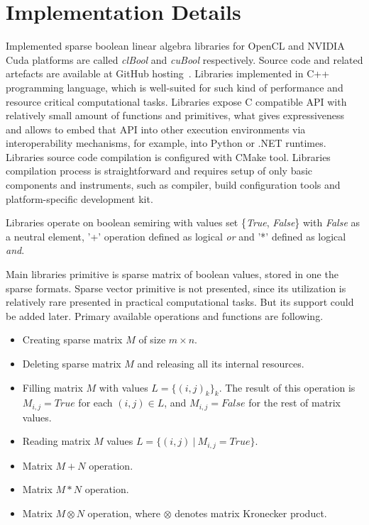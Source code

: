 \section{Implementation Details}



Implemented sparse boolean linear algebra libraries for OpenCL and NVIDIA Cuda platforms are called
\textit{clBool} and \textit{cuBool} respectively. Source code and related artefacts are available at GitHub 
hosting~\cite{todo1, todo2}. Libraries implemented in C++ programming language, which is well-suited for such 
kind of performance and resource critical computational tasks. Libraries expose C compatible API with 
relatively small amount of functions and primitives, what gives expressiveness and allows to embed that API 
into other execution environments via interoperability mechanisms, for example, into Python or .NET runtimes. 
Libraries source code compilation is configured with CMake tool. Libraries compilation process is 
straightforward and requires setup of only basic components and instruments, such as compiler, build 
configuration tools and platform-specific development kit.

Libraries operate on boolean semiring with values set \{\textit{True}, \textit{False}\} with \textit{False} as 
a neutral element, '+' operation defined as logical \textit{or} and '*' defined as logical \textit{and}. 

Main libraries primitive is sparse matrix of boolean values, stored in one the sparse formats. Sparse vector 
primitive is not presented, since its utilization is relatively rare presented in practical computational 
tasks. But its support could be added later. Primary available operations and functions are following.

\begin{itemize}
    \item Creating sparse matrix $M$ of size $m \times n$.
    \item Deleting sparse matrix $M$ and releasing all its internal resources.
    \item Filling matrix $M$ with values $L = \{(i,j)_k\}_k$. The result of this operation is $M_{i,j} = 
    \textit{True}$ for each $(i, j) \in L$, and $M_{i,j} = \textit{False}$ for the rest of matrix values.
    \item Reading matrix $M$ values $L = \{(i, j)~|~M_{i,j} = \textit{True}\}$.
    \item Matrix $M + N$ operation.
    \item Matrix $M * N$ operation.
    \item Matrix $M \otimes N$ operation, where $\otimes$ denotes matrix Kronecker product.
\end{itemize}

